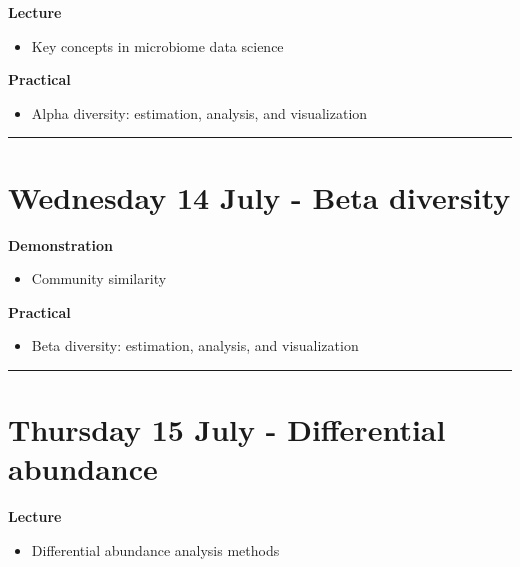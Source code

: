 \documentclass[
  oneside]{book}
\providecommand{\tightlist}{%
  \setlength{\itemsep}{0pt}\setlength{\parskip}{0pt}}
\begin{document}
\textbf{Lecture}

\begin{itemize}
\tightlist
\item
  Key concepts in microbiome data science
\end{itemize}

\textbf{Practical}

\begin{itemize}
\tightlist
\item
  Alpha diversity: estimation, analysis, and visualization
\end{itemize}

\begin{center}\rule{0.5\linewidth}{0.5pt}\end{center}

\hypertarget{wednesday-14-july---beta-diversity}{%
\section{Wednesday 14 July - Beta diversity}\label{wednesday-14-july---beta-diversity}}

\textbf{Demonstration}

\begin{itemize}
\tightlist
\item
  Community similarity
\end{itemize}

\textbf{Practical}

\begin{itemize}
\tightlist
\item
  Beta diversity: estimation, analysis, and visualization
\end{itemize}

\begin{center}\rule{0.5\linewidth}{0.5pt}\end{center}

\hypertarget{thursday-15-july---differential-abundance}{%
\section{Thursday 15 July - Differential abundance}\label{thursday-15-july---differential-abundance}}

\textbf{Lecture}

\begin{itemize}
\tightlist
\item
  Differential abundance analysis methods
\end{itemize}
\end{document}
